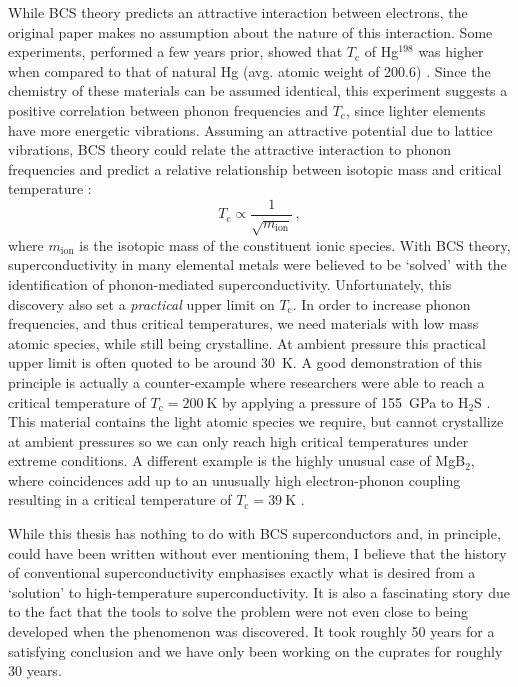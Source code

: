 While BCS theory predicts an attractive interaction between electrons, the original paper \cite{Bardeen1957} makes no assumption about the nature of this interaction. Some experiments, performed a few years prior, showed that $T_\text{c}$ of Hg$^{198}$ was higher when compared to that of natural Hg (avg. atomic weight of 200.6) \cite{Maxwell1950, Reynolds1950}. Since the chemistry of these materials can be assumed identical, this experiment suggests a positive correlation between phonon frequencies and $T_\text{c}$, since lighter elements have more energetic vibrations. Assuming an attractive potential due to lattice vibrations, BCS theory could relate the attractive interaction to phonon frequencies and predict a relative relationship between isotopic mass and critical temperature \cite{DeLaunay1954}:
%
\[ T_\text{c} \propto \frac{1}{\sqrt{m_\text{ion}}} \, , \]
%
where $m_\text{ion}$ is the isotopic mass of the constituent ionic species. With BCS theory, superconductivity in many elemental metals were believed to be `solved' with the identification of phonon-mediated superconductivity. Unfortunately, this discovery also set a \emph{practical} upper limit on $T_\text{c}$. In order to increase phonon frequencies, and thus critical temperatures, we need materials with low mass atomic species, while still being crystalline. At ambient pressure this practical upper limit is often quoted to be around \SI{30}{\kelvin}. A good demonstration of this principle is actually a counter-example where researchers were able to reach a critical temperature of $T_\text{c} = \SI{200}{\kelvin}$ by applying a pressure of \SI{155}{\giga\pascal} to H$_2$S \cite{Drozdov2015}. This material contains the light atomic species we require, but cannot crystallize at ambient pressures so we can only reach high critical temperatures under extreme conditions. A different example is the highly unusual case of MgB$_2$, where coincidences add up to an unusually high electron-phonon coupling resulting in a critical temperature of $T_\text{c} = \SI{39}{\kelvin}$ \cite{Nagamatsu2001}.

While this thesis has nothing to do with BCS superconductors and, in principle, could have been written without ever mentioning them, I believe that the history of conventional superconductivity emphasises exactly what is desired from a `solution' to high-temperature superconductivity. It is also a fascinating story due to the fact that the tools to solve the problem were not even close to being developed when the phenomenon was discovered. It took roughly 50 years for a satisfying conclusion and we have only been working on the cuprates for roughly 30 years. 

